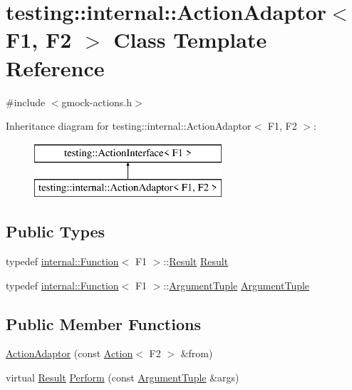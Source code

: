 \hypertarget{classtesting_1_1internal_1_1_action_adaptor}{}\section{testing\+::internal\+::Action\+Adaptor$<$ F1, F2 $>$ Class Template Reference}
\label{classtesting_1_1internal_1_1_action_adaptor}


{\ttfamily \#include $<$gmock-\/actions.\+h$>$}

Inheritance diagram for testing\+::internal\+::Action\+Adaptor$<$ F1, F2 $>$\+:\begin{figure}[H]
\begin{center}
\leavevmode
\includegraphics[height=2.000000cm]{d3/d8c/classtesting_1_1internal_1_1_action_adaptor}
\end{center}
\end{figure}
\subsection*{Public Types}
\begin{DoxyCompactItemize}
\item 
typedef \mbox{\hyperlink{structtesting_1_1internal_1_1_function}{internal\+::\+Function}}$<$ F1 $>$\+::\mbox{\hyperlink{classtesting_1_1internal_1_1_action_adaptor_afa8f7872b6db3d8f1545fd98b45b0b95}{Result}} \mbox{\hyperlink{classtesting_1_1internal_1_1_action_adaptor_afa8f7872b6db3d8f1545fd98b45b0b95}{Result}}
\item 
typedef \mbox{\hyperlink{structtesting_1_1internal_1_1_function}{internal\+::\+Function}}$<$ F1 $>$\+::\mbox{\hyperlink{classtesting_1_1internal_1_1_action_adaptor_a4f78fb73f97b72fea8a93b78a8ab5704}{Argument\+Tuple}} \mbox{\hyperlink{classtesting_1_1internal_1_1_action_adaptor_a4f78fb73f97b72fea8a93b78a8ab5704}{Argument\+Tuple}}
\end{DoxyCompactItemize}
\subsection*{Public Member Functions}
\begin{DoxyCompactItemize}
\item 
\mbox{\hyperlink{classtesting_1_1internal_1_1_action_adaptor_a24ba3330ef3cc365b956c50ec73e4177}{Action\+Adaptor}} (const \mbox{\hyperlink{classtesting_1_1_action}{Action}}$<$ F2 $>$ \&from)
\item 
virtual \mbox{\hyperlink{classtesting_1_1internal_1_1_action_adaptor_afa8f7872b6db3d8f1545fd98b45b0b95}{Result}} \mbox{\hyperlink{classtesting_1_1internal_1_1_action_adaptor_a8d8a47a31f068cf6e0c95b91605d5540}{Perform}} (const \mbox{\hyperlink{classtesting_1_1internal_1_1_action_adaptor_a4f78fb73f97b72fea8a93b78a8ab5704}{Argument\+Tuple}} \&args)
\end{DoxyCompactItemize}
